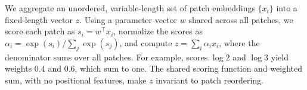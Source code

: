 We aggregate an unordered, variable-length set of patch embeddings $\{x_i\}$ into a fixed-length vector $z$. Using a parameter vector $w$ shared across all patches, we score each patch as $s_i=w^\top x_i$, normalize the scores as $\alpha_i=\exp(s_i)/\sum_j\exp(s_j)$, and compute $z=\sum_i\alpha_i x_i$, where the denominator sums over all patches. For example, scores $\log 2$ and $\log 3$ yield weights $0.4$ and $0.6$, which sum to one. The shared scoring function and weighted sum, with no positional features, make $z$ invariant to patch reordering.
